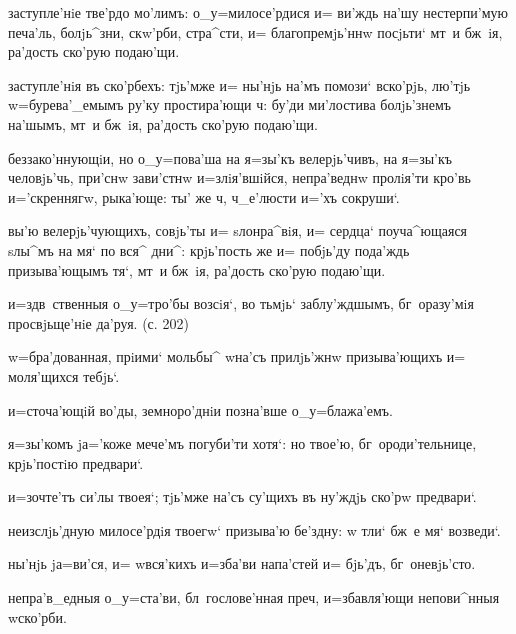 заступле'нiе тве'рдо мо'лимъ: о_у=милосе'рдися и= ви'ждь 
на'шу нестерпи'мую печа'ль, болjь^зни, скw'рби, стра^сти, 
и= благопремjь'ннw посjьти` мт~и бж~iя, ра'дость ско'рую 
подаю'щи.

заступле'нiя въ ско'рбехъ: тjь'мже и= ны'нjь на'мъ 
помози` вско'рjь, лю'тjь w=бурева'_емымъ ру'ку 
простира'ющи ч: бу'ди ми'лостива болjь'знемъ 
на'шымъ, мт~и бж~iя, ра'дость ско'рую подаю'щи.

беззако'ннующiи, но о_у=пова'ша на я=зы'къ велерjь'чивъ, 
на я=зы'къ человjь'чь, при'снw зави'стнw и=злiя'вшiйся, 
непра'веднw пролiя'ти кро'вь и='скреннягw, рыка'юще: ты' 
же ч, ч_е'люсти и='хъ сокруши`.

вы'ю велерjь'чующихъ, совjь'ты и= sлонра^вiя, и= сердца` 
поуча^ющаяся sлы^мъ на мя` по вся^ дни^: крjь'пость же и= 
побjь'ду пода'ждь призыва'ющымъ тя`, мт~и бж~iя, ра'дость 
ско'рую подаю'щи.


и=з\ъ дв~ственныя о_у=тро'бы возсiя`, во тьмjь` 
заблу'ждшымъ, бг~оразу'мiя просвjьще'нiе да'руя. (с. 202)

w=бра'дованная, прiими` мольбы^ w\т на'съ прилjь'жнw 
призыва'ющихъ и= моля'щихся тебjь`.

и=сточа'ющiй во'ды, земноро'днiи позна'вше о_у=блажа'емъ.

я=зы'комъ jа='коже мече'мъ погуби'ти хотя`: но твое'ю, 
бг~ороди'тельнице, крjь'постiю предвари`.

и=зочте'тъ си'лы твоея`; тjь'мже на'съ су'щихъ въ ну'ждjь 
ско'рw предвари`.


неизслjь'дную милосе'рдiя твоегw` призыва'ю бе'здну: w\т 
тли` бж~е мя` возведи`.

ны'нjь jа=ви'ся, и= w\т вся'кихъ и=зба'ви напа'стей и= 
бjь'дъ, бг~оневjь'сто.

непра'в_едныя о_у=ста'ви, бл~гослове'нная преч, 
и=збавля'ющи непови^нныя w\т ско'рби.

